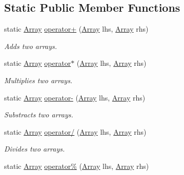 \subsection*{Static Public Member Functions}
\begin{DoxyCompactItemize}
\item 
static \mbox{\hyperlink{classkhiva_1_1array_1_1_array}{Array}} \mbox{\hyperlink{classkhiva_1_1array_1_1_array_ac9e97f3bcab5b1d144627e859758887a}{operator+}} (\mbox{\hyperlink{classkhiva_1_1array_1_1_array}{Array}} lhs, \mbox{\hyperlink{classkhiva_1_1array_1_1_array}{Array}} rhs)
\begin{DoxyCompactList}\small\item\em Adds two arrays. \end{DoxyCompactList}\item 
static \mbox{\hyperlink{classkhiva_1_1array_1_1_array}{Array}} \mbox{\hyperlink{classkhiva_1_1array_1_1_array_ac414d3eaa3d9e007d00dac663890e205}{operator$\ast$}} (\mbox{\hyperlink{classkhiva_1_1array_1_1_array}{Array}} lhs, \mbox{\hyperlink{classkhiva_1_1array_1_1_array}{Array}} rhs)
\begin{DoxyCompactList}\small\item\em Multiplies two arrays. \end{DoxyCompactList}\item 
static \mbox{\hyperlink{classkhiva_1_1array_1_1_array}{Array}} \mbox{\hyperlink{classkhiva_1_1array_1_1_array_a16054029322102ab9f9e7cea45430bcd}{operator-\/}} (\mbox{\hyperlink{classkhiva_1_1array_1_1_array}{Array}} lhs, \mbox{\hyperlink{classkhiva_1_1array_1_1_array}{Array}} rhs)
\begin{DoxyCompactList}\small\item\em Substracts two arrays. \end{DoxyCompactList}\item 
static \mbox{\hyperlink{classkhiva_1_1array_1_1_array}{Array}} \mbox{\hyperlink{classkhiva_1_1array_1_1_array_ab2e76a11f2c6a71975ef5f0fde70eab8}{operator/}} (\mbox{\hyperlink{classkhiva_1_1array_1_1_array}{Array}} lhs, \mbox{\hyperlink{classkhiva_1_1array_1_1_array}{Array}} rhs)
\begin{DoxyCompactList}\small\item\em Divides two arrays. \end{DoxyCompactList}\item 
static \mbox{\hyperlink{classkhiva_1_1array_1_1_array}{Array}} \mbox{\hyperlink{classkhiva_1_1array_1_1_array_ad68751be70f9242bfcc539143c6690b8}{operator\%}} (\mbox{\hyperlink{classkhiva_1_1array_1_1_array}{Array}} lhs, \mbox{\hyperlink{classkhiva_1_1array_1_1_array}{Array}} rhs)

\end{DoxyCompactItemize}
